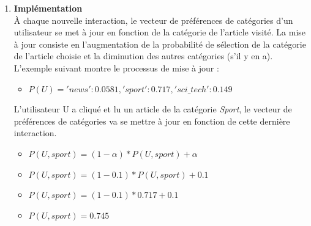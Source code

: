 \begin{enumerate}[leftmargin=*]
            \item\textbf{Implémentation}\\
            À chaque nouvelle interaction, le vecteur de préférences de catégories d'un utilisateur se met à jour en fonction de la catégorie  de l'article visité. La mise à jour consiste en l'augmentation de la probabilité de sélection de la catégorie de l'article choisie et la diminution des autres catégories (s'il y en a). 
            L'exemple suivant montre le processus de mise à jour :
            \begin{itemize}[label={}]
                \item $P(U) = {'news': 0.0581,'sport': 0.717, 'sci\_tech': 0.149}$\\
            \end{itemize}

            L'utilisateur U a cliqué et lu un article de la catégorie \emph{Sport}, le vecteur de préférences de catégories va se mettre à jour en fonction de cette dernière interaction.
            \begin{itemize}[label={}]
                \item $P(U, sport) = (1-{\alpha}) * {P(U, sport)} + {\alpha}$
                \item $P(U, sport) = (1-{0.1}) * {P(U, sport)} + {0.1}$
                \item $P(U, sport) = (1-{0.1}) * {0.717} + {0.1}$
                \item $P(U, sport) = 0.745$
            \end{itemize}


\end{enumerate}
